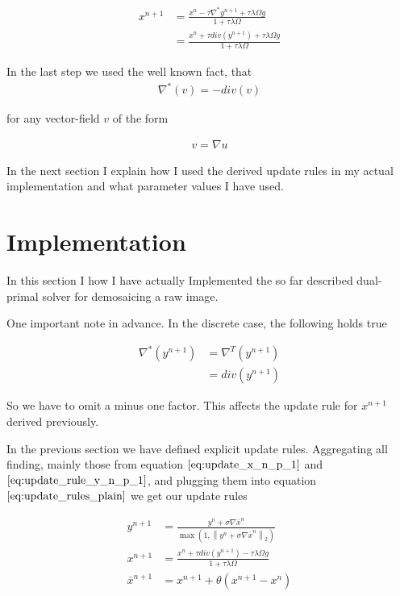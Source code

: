 \documentclass{paper}
\newcommand{\twonorm}[1]{\left\lVert#1\right\rVert_2}
\begin{document}
\begin{align}
	x^{n+1} 
	&= \frac{x^n - \tau \nabla^* y^{n+1} +  \tau \lambda \Omega g}{1+\tau \lambda \Omega} \nonumber \\
	&= \frac{x^n + \tau div(y^{n+1}) +  \tau \lambda \Omega g}{1+\tau \lambda \Omega}
\label{eq:update_x_n_p_1}	
\end{align}

In the last step we used the well known fact, that 
\begin{align}
	\nabla^* (v) = -div(v)
\end{align}

for any vector-field $v$ of the form 

\begin{align}
	v = \nabla u
\end{align}

In the next section I explain how I used the derived update rules in my actual implementation and what parameter values I have used. 

\section{Implementation}

In this section I how I have actually Implemented the so far described dual-primal solver for demosaicing a raw image.

One important note in advance. In the discrete case, the following holds true 

\begin{align}
	\nabla^* (y^{n+1}) 
	&= \nabla^{T} (y^{n+1}) \nonumber \\
	&= div(y^{n+1})
\end{align}

So we have to omit a minus one factor. This affects the update rule for $x^{n+1}$ derived previously.

In the previous section we have defined explicit update rules. Aggregating all finding, mainly those from equation $\ref{eq:update_x_n_p_1}$ and $\ref{eq:update_rule_y_n_p_1}$, and plugging them into equation $\ref{eq:update_rules_plain}$ we get our update rules


\begin{align}
	y^{n+1} &= \frac{y^n + \sigma \nabla \bar{x}^{n}}{\max{\left(1,\twonorm{y^n + \sigma \nabla \bar{x}^{n}} \right)}} \nonumber \\
	x^{n+1} &= \frac{x^n + \tau div(y^{n+1}) -  \tau \lambda \Omega g}{1+\tau \lambda \Omega} \\
	\bar{x}^{n+1} &= x^{n+1} + \theta(x^{n+1} - x^n)
\label{eq:final_update_rules_plain}	
\end{align}
\end{document}
